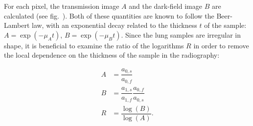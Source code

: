 For each pixel, the transmission image $A$ and the
dark-field image $B$ are calculated (see fig.~). Both of these
quantities are known to follow the Beer-Lambert law, with an exponential
decay related to the thickness $t$ of the sample: $A = \exp(-\mu_A t)$, $B =
\exp(-\mu_B t)$. Since the lung samples are irregular in shape, it is
beneficial to examine the ratio of the logarithms $R$ in
order to remove the local dependence on the thickness of the sample in the
radiography:

\begin{align*}
    A &= \dfrac{a_{0,s}}{a_{0,f}}\\
    B &= \dfrac{a_{1,s}}{a_{1,f}}\dfrac{a_{0,f}}{a_{0,s}}\\
    R &= \dfrac{\log(B)}{\log(A)}.
    \label{eqn:definitions}
\end{align*}
